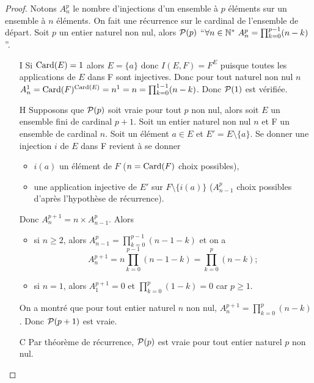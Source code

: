 \begin{proof}
  Notons \(A_n^p\) le nombre d'injections d'un ensemble à \(p\) éléments sur un 
  ensemble à \(n\) éléments. On fait une récurrence sur le cardinal de 
  l'ensemble de départ. Soit \(p\) un entier naturel non nul, alors \(\P(p)\) 
  ``\(\forall n \in \N^* \ A_n^p = \prod_{k = 0}^{p - 1}(n - k)\)''.
  \begin{itemize}
    \item[I] Si \(\Card(E) = 1\) alors \(E = \{a\}\) donc \(I(E, F) = F^E\) 
      puisque toutes les applications de \(E\) dans F sont injectives. Donc pour 
      tout naturel non nul \(n\) \(A_n^1 = \Card(F)^{\Card(E)} = n^1 = n = 
      \prod_{k = 0}^{1 - 1}(n - k)\).  Donc \(\P(1)\) est vérifiée.
    \item[H] Supposons que \(\P(p)\) soit vraie pour tout \(p\) non nul, alors 
      soit \(E\) un ensemble fini de cardinal \(p + 1\). Soit un entier naturel 
      non nul \(n\) et F un ensemble de cardinal \(n\). Soit un élément \(a\in 
      E\) et \(E' = E\setminus\{a\}\). Se donner une injection \(i\) de \(E\) 
      dans F revient à se donner
      \begin{itemize}
        \item \(i(a)\) un élément de \(F\) (\(n = \Card(F)\) choix possibles),
        \item une application injective de \(E'\) sur \(F\setminus\{i(a)\}\) 
          (\(A_{n - 1}^p\) choix possibles d'après l'hypothèse de récurrence).
      \end{itemize}
      Donc \(A_{n}^{p + 1} = n \times A_{n - 1}^p\). Alors \begin{itemize}
        \item si \(n\geqslant 2\), alors  \(A_{n - 1}^p = \prod_{k = 0}^{p - 
          1}(n - 1 - k)\) et on a
          \begin{equation}
            A_{n}^{p + 1} = n\prod_{k = 0}^{p - 1}(n - 1 - k) = \prod_{k = 
            0}^{p}(n - k);
          \end{equation}
        \item si \(n = 1\), alors \(A_{1}^{p + 1} = 0\) et \(\prod_{k = 0}^{p}(1 
          - k) = 0\) car \(p\geqslant 1\).
      \end{itemize}
      On a montré que pour tout entier naturel \(n\) non nul, \(A_{n}^{p + 1} = 
      \prod_{k = 0}^{p}(n - k)\). Donc \(\P(p + 1)\) est vraie.
    \item[C] Par théorème de récurrence, \(\P(p)\) est vraie pour tout entier 
      naturel \(p\) non nul.
  \end{itemize}
\end{proof}

